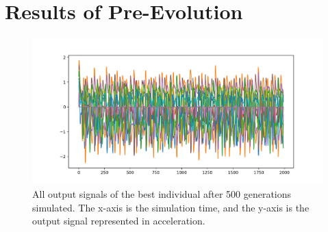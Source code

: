 \section{Results of Pre-Evolution} \label{resultsOfPreEvolution}

\begin{figure}[htbp]
    \centering
    \includegraphics[width=\textwidth]{include/figure/output_500gen_w.png}
    \caption{All output signals of the best individual after 500 generations simulated. The x-axis is the simulation time, and the y-axis is the output signal represented in acceleration.}
    \label{fig:output}
\end{figure}


